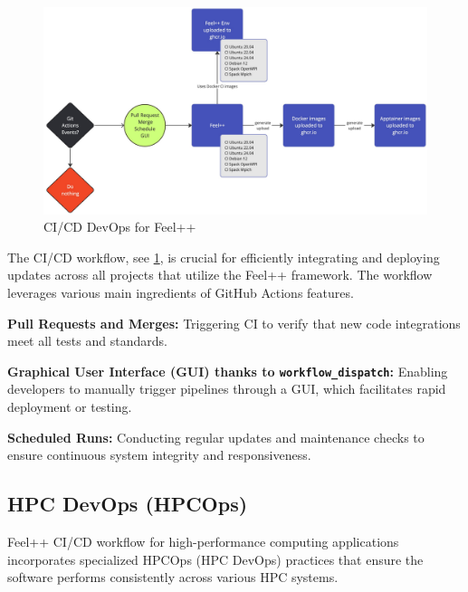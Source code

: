 \documentclass[runningheads]{llncs}
\begin{document}
\begin{figure}
    \centering
    \includegraphics[width=\textwidth]{img-feelpp-devops.pdf}
    \caption{CI/CD DevOps for Feel++}
    \label{fig:feelpp-devops}
\end{figure}
The CI/CD workflow, see \cref{fig:feelpp-devops}, is crucial for efficiently integrating and deploying updates across all projects that utilize the Feel++ framework. 
The workflow leverages various main ingredients of GitHub Actions features.
\begin{inparaenum}[\it (1)]
    \item \textbf{Pull Requests and Merges:} Triggering CI to verify that new code integrations meet all tests and standards.
    \item \textbf{Graphical User Interface (GUI) thanks to \texttt{workflow\_dispatch}:} Enabling developers to manually trigger pipelines through a GUI, which facilitates rapid deployment or testing.
    \item \textbf{Scheduled Runs:} Conducting regular updates and maintenance checks to ensure continuous system integrity and responsiveness.
\end{inparaenum}




\subsection{HPC DevOps (HPCOps)}
Feel++ CI/CD workflow for high-performance computing applications incorporates specialized HPCOps (HPC DevOps) practices that ensure the software performs consistently across various HPC systems.

\end{document}
